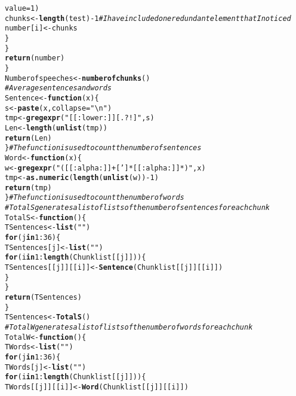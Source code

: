 \documentclass{article}\usepackage[]{graphicx}\usepackage[]{color}
\makeatletter
\newcommand{\hlnum}[1]{\textcolor[rgb]{0.686,0.059,0.569}{#1}}%
\newcommand{\hlstr}[1]{\textcolor[rgb]{0.192,0.494,0.8}{#1}}%
\newcommand{\hlcom}[1]{\textcolor[rgb]{0.678,0.584,0.686}{\textit{#1}}}%
\newcommand{\hlopt}[1]{\textcolor[rgb]{0,0,0}{#1}}%
\newcommand{\hlstd}[1]{\textcolor[rgb]{0.345,0.345,0.345}{#1}}%
\newcommand{\hlkwa}[1]{\textcolor[rgb]{0.161,0.373,0.58}{\textbf{#1}}}%
\newcommand{\hlkwb}[1]{\textcolor[rgb]{0.69,0.353,0.396}{#1}}%
\newcommand{\hlkwc}[1]{\textcolor[rgb]{0.333,0.667,0.333}{#1}}%
\newcommand{\hlkwd}[1]{\textcolor[rgb]{0.737,0.353,0.396}{\textbf{#1}}}%
\newenvironment{kframe}{%
 \def\at@end@of@kframe{}%
 \ifinner\ifhmode%
  \def\at@end@of@kframe{\end{minipage}}%
  \begin{minipage}{\columnwidth}%
 \fi\fi%
 \def\FrameCommand##1{\hskip\@totalleftmargin \hskip-\fboxsep
 \colorbox{shadecolor}{##1}\hskip-\fboxsep
     \hskip-\linewidth \hskip-\@totalleftmargin \hskip\columnwidth}%
 \MakeFramed {\advance\hsize-\width
   \@totalleftmargin\z@ \linewidth\hsize
   \@setminipage}}%
 {\par\unskip\endMakeFramed%
 \at@end@of@kframe}
\newenvironment{knitrout}{}{} %
\makeatother
\begin{document}
\begin{knitrout}
\begin{kframe}
\begin{alltt}
                \hlkwc{value} \hlstd{=} \hlnum{1}\hlstd{)}
            \hlstd{chunks} \hlkwb{<-} \hlkwd{length}\hlstd{(test)} \hlopt{-} \hlnum{1}  \hlcom{#I have included one redundant element that I noticed}
            \hlstd{number[i]} \hlkwb{<-} \hlstd{chunks}
        \hlstd{\}}
    \hlstd{\}}
    \hlkwd{return}\hlstd{(number)}
\hlstd{\}}
\hlstd{Numberofspeeches} \hlkwb{<-} \hlkwd{numberofchunks}\hlstd{()}
\hlcom{# Average sentences and words}
\hlstd{Sentence} \hlkwb{<-} \hlkwa{function}\hlstd{(}\hlkwc{x}\hlstd{) \{}
    \hlstd{s} \hlkwb{<-} \hlkwd{paste}\hlstd{(x,} \hlkwc{collapse} \hlstd{=} \hlstr{"\textbackslash{}n"}\hlstd{)}
    \hlstd{tmp} \hlkwb{<-} \hlkwd{gregexpr}\hlstd{(}\hlstr{"[[:lower:]][.?!]"}\hlstd{, s)}
    \hlstd{Len} \hlkwb{<-} \hlkwd{length}\hlstd{(}\hlkwd{unlist}\hlstd{(tmp))}
    \hlkwd{return}\hlstd{(Len)}
\hlstd{\}}  \hlcom{#The function is used to count the number of sentences}
\hlstd{Word} \hlkwb{<-} \hlkwa{function}\hlstd{(}\hlkwc{x}\hlstd{) \{}
    \hlstd{w} \hlkwb{<-} \hlkwd{gregexpr}\hlstd{(}\hlstr{"([[:alpha:]]+[']*[[:alpha:]]*)"}\hlstd{, x)}
    \hlstd{tmp} \hlkwb{<-} \hlkwd{as.numeric}\hlstd{(}\hlkwd{length}\hlstd{(}\hlkwd{unlist}\hlstd{(w))} \hlopt{-} \hlnum{1}\hlstd{)}
    \hlkwd{return}\hlstd{(tmp)}
\hlstd{\}}  \hlcom{#The function is used to count the number of words}
\hlcom{# TotalS generates a list of lists of the number of sentences for each chunk}
\hlstd{TotalS} \hlkwb{<-} \hlkwa{function}\hlstd{() \{}
    \hlstd{TSentences} \hlkwb{<-} \hlkwd{list}\hlstd{(}\hlstr{""}\hlstd{)}
    \hlkwa{for} \hlstd{(j} \hlkwa{in} \hlnum{1}\hlopt{:}\hlnum{36}\hlstd{) \{}
        \hlstd{TSentences[j]} \hlkwb{<-} \hlkwd{list}\hlstd{(}\hlstr{""}\hlstd{)}
        \hlkwa{for} \hlstd{(i} \hlkwa{in} \hlnum{1}\hlopt{:}\hlkwd{length}\hlstd{(Chunklist[[j]])) \{}
            \hlstd{TSentences[[j]][[i]]} \hlkwb{<-} \hlkwd{Sentence}\hlstd{(Chunklist[[j]][[i]])}
        \hlstd{\}}
    \hlstd{\}}
    \hlkwd{return}\hlstd{(TSentences)}
\hlstd{\}}
\hlstd{TSentences} \hlkwb{<-} \hlkwd{TotalS}\hlstd{()}
\hlcom{# TotalW generates a list of lists of the number of words for each chunk}
\hlstd{TotalW} \hlkwb{<-} \hlkwa{function}\hlstd{() \{}
    \hlstd{TWords} \hlkwb{<-} \hlkwd{list}\hlstd{(}\hlstr{""}\hlstd{)}
    \hlkwa{for} \hlstd{(j} \hlkwa{in} \hlnum{1}\hlopt{:}\hlnum{36}\hlstd{) \{}
        \hlstd{TWords[j]} \hlkwb{<-} \hlkwd{list}\hlstd{(}\hlstr{""}\hlstd{)}
        \hlkwa{for} \hlstd{(i} \hlkwa{in} \hlnum{1}\hlopt{:}\hlkwd{length}\hlstd{(Chunklist[[j]])) \{}
            \hlstd{TWords[[j]][[i]]} \hlkwb{<-} \hlkwd{Word}\hlstd{(Chunklist[[j]][[i]])}

\end{alltt}
\end{kframe}
\end{knitrout}
\end{document}
